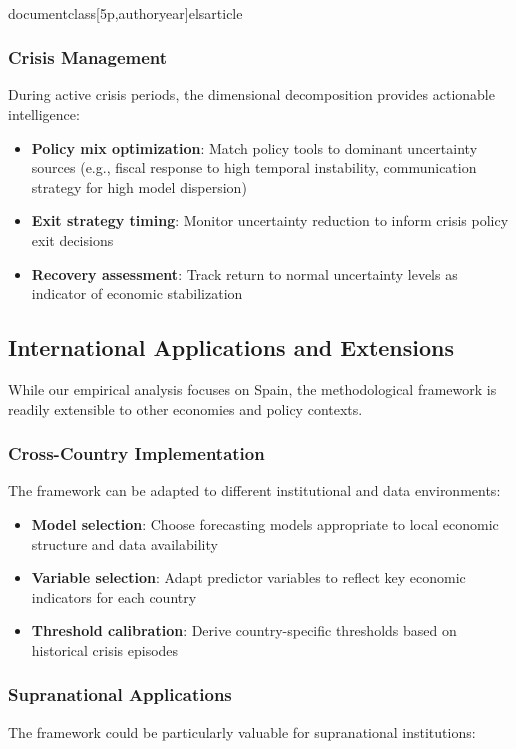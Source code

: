 \\documentclass[5p,authoryear]{elsarticle}
\begin{document}
{\subsubsection{Crisis Management}
During active crisis periods, the dimensional decomposition provides actionable intelligence:

\begin{itemize}
    \item \textbf{Policy mix optimization}: Match policy tools to dominant uncertainty sources (e.g., fiscal response to high temporal instability, communication strategy for high model dispersion)
    \item \textbf{Exit strategy timing}: Monitor uncertainty reduction to inform crisis policy exit decisions
    \item \textbf{Recovery assessment}: Track return to normal uncertainty levels as indicator of economic stabilization
\end{itemize}

\subsection{International Applications and Extensions}

While our empirical analysis focuses on Spain, the methodological framework is readily extensible to other economies and policy contexts.

\subsubsection{Cross-Country Implementation}
The framework can be adapted to different institutional and data environments:

\begin{itemize}
    \item \textbf{Model selection}: Choose forecasting models appropriate to local economic structure and data availability
    \item \textbf{Variable selection}: Adapt predictor variables to reflect key economic indicators for each country
    \item \textbf{Threshold calibration}: Derive country-specific thresholds based on historical crisis episodes
\end{itemize}

\subsubsection{Supranational Applications}
The framework could be particularly valuable for supranational institutions:

}
\end{document}
